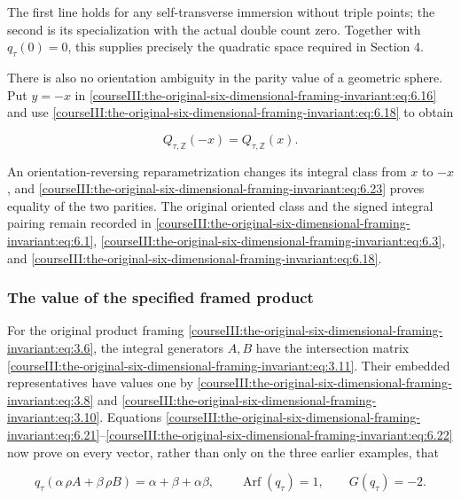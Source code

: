 The first line holds for any self-transverse immersion without triple points; the second is its specialization with the actual double count zero. Together with \(q_\tau(0)=0\), this supplies precisely the quadratic space required in Section 4.

There is also no orientation ambiguity in the parity value of a geometric sphere. Put \(y=-x\) in \eqref{courseIII:the-original-six-dimensional-framing-invariant:eq:6.16} and use \eqref{courseIII:the-original-six-dimensional-framing-invariant:eq:6.18} to obtain

\begin{equation}
Q_{\tau,\mathbb Z}(-x)=Q_{\tau,\mathbb Z}(x).
 \label{courseIII:the-original-six-dimensional-framing-invariant:eq:6.23}
\end{equation}

An orientation-reversing reparametrization changes its integral class from \(x\) to \(-x\), and \eqref{courseIII:the-original-six-dimensional-framing-invariant:eq:6.23} proves equality of the two parities. The original oriented class and the signed integral pairing remain recorded in \eqref{courseIII:the-original-six-dimensional-framing-invariant:eq:6.1}, \eqref{courseIII:the-original-six-dimensional-framing-invariant:eq:6.3}, and \eqref{courseIII:the-original-six-dimensional-framing-invariant:eq:6.18}.

\subsubsection{The value of the specified framed product}
\label{courseIII:the-original-six-dimensional-framing-invariant:section-6.4}

For the original product framing \eqref{courseIII:the-original-six-dimensional-framing-invariant:eq:3.6}, the integral generators \(A,B\) have the intersection matrix \eqref{courseIII:the-original-six-dimensional-framing-invariant:eq:3.11}. Their embedded representatives have values one by \eqref{courseIII:the-original-six-dimensional-framing-invariant:eq:3.8} and \eqref{courseIII:the-original-six-dimensional-framing-invariant:eq:3.10}. Equations \eqref{courseIII:the-original-six-dimensional-framing-invariant:eq:6.21}--\eqref{courseIII:the-original-six-dimensional-framing-invariant:eq:6.22} now prove on every vector, rather than only on the three earlier examples, that

\begin{equation}
q_\tau(\alpha\,\rho A+\beta\,\rho B)
       =\alpha+\beta+\alpha\beta,\qquad
 \operatorname{Arf}(q_\tau)=1,\qquad
                 G(q_\tau)=-2.
 \label{courseIII:the-original-six-dimensional-framing-invariant:eq:6.24}
\end{equation}

